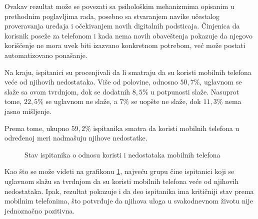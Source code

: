 \documentclass{article}
\begin{document}
Ovakav rezultat može se povezati sa psihološkim mehanizmima opisanim u prethodnim poglavljima rada, posebno sa stvaranjem navike učestalog proveravanja uređaja i očekivanjem novih digitalnih podsticaja. Činjenica da korisnik poseže za telefonom i kada nema novih obaveštenja pokazuje da njegovo korišćenje ne mora uvek biti izazvano konkretnom potrebom, već može postati automatizovano ponašanje.

Na kraju, ispitanici su procenjivali da li smatraju da su koristi mobilnih telefona veće od njihovih nedostataka. Više od polovine, odnosno $50{,}7\%$, uglavnom se slaže sa ovom tvrdnjom, dok se dodatnih $8{,}5\%$ u potpunosti slaže. Nasuprot tome, $22{,}5\%$ se uglavnom ne slaže, a $7\%$ se uopšte ne slaže, dok $11{,}3\%$ nema jasno mišljenje.

Prema tome, ukupno $59{,}2\%$ ispitanika smatra da koristi mobilnih telefona u određenoj meri nadmašuju njihove nedostatke.

\begin{figure}[ht]
\centering


\caption{Stav ispitanika o odnosu koristi i nedostataka mobilnih telefona}
\label{fig:koristi-nedostaci}
\end{figure}


Kao što se može videti na grafikonu \ref{fig:koristi-nedostaci}, najveću grupu čine ispitanici koji se uglavnom slažu sa tvrdnjom da su koristi mobilnih telefona veće od njihovih nedostataka. Ipak, rezultat pokazuje i da deo ispitanika ima kritičniji stav prema mobilnim telefonima, što potvrđuje da njihova uloga u svakodnevnom životu nije jednoznačno pozitivna.
\end{document}
